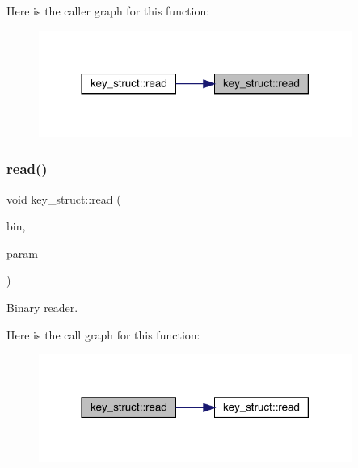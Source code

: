 Here is the caller graph for this function\+:
\nopagebreak
\begin{figure}[H]
\begin{center}
\leavevmode
\includegraphics[width=290pt]{da/df3/namespacekey__struct_a7ee02ccf72111091675d9639205389d0_icgraph}
\end{center}
\end{figure}
\mbox{\label{namespacekey__struct_af87b39a16fa43d4e3fe23d887e11906e}} 
\subsubsection{\texorpdfstring{read()}{read()}\hspace{0.1cm}{\footnotesize\ttfamily [2/2]}}
{\footnotesize\ttfamily void key\+\_\+struct\+::read (\begin{DoxyParamCaption}\item[{Binary\+Reader \&}]{bin,  }\item[{\mbox{\hyperlink{structkey__struct_1_1KeyHadronSUNNPartNPtIrrep__t}{Key\+Hadron\+S\+U\+N\+N\+Part\+N\+Pt\+Irrep\+\_\+t}} \&}]{param }\end{DoxyParamCaption})}



Binary reader. 

Here is the call graph for this function\+:
\nopagebreak
\begin{figure}[H]
\begin{center}
\leavevmode
\includegraphics[width=290pt]{da/df3/namespacekey__struct_af87b39a16fa43d4e3fe23d887e11906e_cgraph}
\end{center}
\end{figure}
\mbox{\label{namespacekey__struct_ac9ae019c63b9f6291b3cf45bfc51d147}} 
